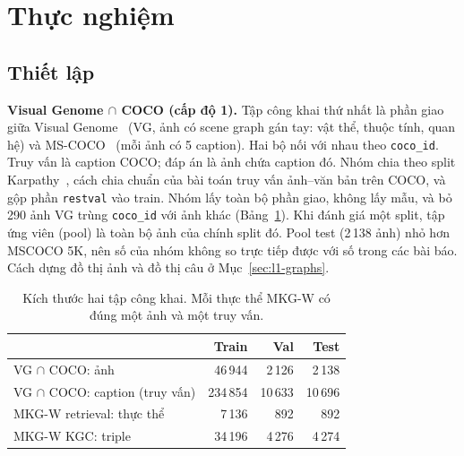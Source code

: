 \section{Thực nghiệm}
\label{sec:exp}

\subsection{Thiết lập}
\label{sec:data}

\textbf{Visual Genome $\cap$ COCO (cấp độ 1).} Tập công khai thứ nhất là phần giao giữa Visual Genome~\cite{krishna2017vg}
(VG, ảnh có scene graph gán tay: vật thể, thuộc tính, quan hệ) và MS-COCO~\cite{lin2014coco} (mỗi ảnh có 5 caption). Hai bộ
nối với nhau theo \texttt{coco\_id}. Truy vấn là caption COCO; đáp án là ảnh chứa caption đó. Nhóm chia theo split
Karpathy~\cite{karpathy2015deep}, cách chia chuẩn của bài toán truy vấn ảnh--văn bản trên COCO, và gộp phần \texttt{restval}
vào train. Nhóm lấy toàn bộ phần giao, không lấy mẫu, và bỏ 290 ảnh VG trùng \texttt{coco\_id} với ảnh khác
(Bảng~\ref{tab:data}). Khi đánh giá một split, tập ứng viên (pool) là toàn bộ ảnh của chính split đó. Pool test (2\,138
ảnh) nhỏ hơn MSCOCO 5K, nên số của nhóm không so trực tiếp được với số trong các bài báo. Cách dựng đồ thị ảnh và đồ thị câu
ở Mục~\ref{sec:l1-graphs}.

\begin{table}[t]
\centering
\caption{Kích thước hai tập công khai. Mỗi thực thể MKG-W có đúng một ảnh và một truy vấn.}
\label{tab:data}
\small
\begin{tabular}{lrrr}
\toprule
 & Train & Val & Test \\
\midrule
VG $\cap$ COCO: ảnh & 46\,944 & 2\,126 & 2\,138 \\
VG $\cap$ COCO: caption (truy vấn) & 234\,854 & 10\,633 & 10\,696 \\
\midrule
MKG-W retrieval: thực thể & 7\,136 & 892 & 892 \\
MKG-W KGC: triple & 34\,196 & 4\,276 & 4\,274 \\
\bottomrule
\end{tabular}
\end{table}

